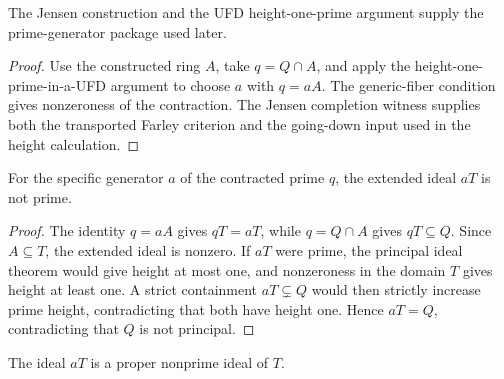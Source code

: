 \begin{lemma}
  \label{lem:prime_generator_source}
  The Jensen construction and the UFD height-one-prime argument supply the
  prime-generator package used later.
\end{lemma}

\begin{proof}
  Use the constructed ring \(A\), take \(q=Q\cap A\), and apply the
  height-one-prime-in-a-UFD argument to choose \(a\) with \(q=aA\).  The
  generic-fiber condition gives nonzeroness of the contraction.  The Jensen
  completion witness supplies both the transported Farley criterion and the
  going-down input used in the height calculation.
\end{proof}

\begin{lemma}
  \label{lem:extended_principal_specific_not_prime}
  For the specific generator \(a\) of the contracted prime \(q\), the extended
  ideal \(aT\) is not prime.
\end{lemma}

\begin{proof}
  The identity \(q=aA\) gives \(qT=aT\), while
  \(q=Q\cap A\) gives \(qT\subseteq Q\).  Since \(A\subseteq T\), the extended
  ideal is nonzero.  If \(aT\) were prime, the principal ideal theorem would
  give height at most one, and nonzeroness in the domain \(T\) gives height at
  least one.  A strict containment \(aT\subsetneq Q\) would then strictly
  increase prime height, contradicting that both have height one.  Hence
  \(aT=Q\), contradicting that \(Q\) is not principal.
\end{proof}

\begin{lemma}
  \label{lem:extended_principal_not_prime}
  The ideal \(aT\) is a proper nonprime ideal of \(T\).
\end{lemma}

